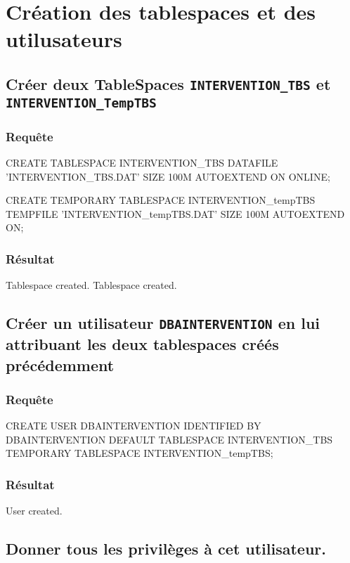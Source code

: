 \documentclass[•]{article}
\begin{document}
\def\reportnumber{1}
\def\reporttitle{Création et manipulation d'une BD}

\section{Création des tablespaces et des utilusateurs}
\subsection{Créer deux TableSpaces \texttt{INTERVENTION\_TBS} et \texttt{INTERVENTION\_TempTBS}}
\subsubsection{Requête}
\begin{sql}
CREATE TABLESPACE INTERVENTION_TBS
DATAFILE 'INTERVENTION_TBS.DAT'
SIZE 100M
AUTOEXTEND ON
ONLINE;

CREATE TEMPORARY TABLESPACE INTERVENTION_tempTBS
TEMPFILE 'INTERVENTION_tempTBS.DAT'
SIZE 100M
AUTOEXTEND ON;
\end{sql}
\subsubsection{Résultat}
\begin{sql}
Tablespace created.
Tablespace created.
\end{sql}
\subsection{Créer un utilisateur \texttt{DBAINTERVENTION} en lui attribuant les deux tablespaces créés précédemment}
\subsubsection{Requête}
\begin{sql}
CREATE USER DBAINTERVENTION
IDENTIFIED BY DBAINTERVENTION
DEFAULT TABLESPACE INTERVENTION_TBS
TEMPORARY TABLESPACE INTERVENTION_tempTBS;
\end{sql}
\subsubsection{Résultat}
\begin{sql}
User created.
\end{sql}
\subsection{Donner tous les privilèges à cet utilisateur.}
\end{document}
